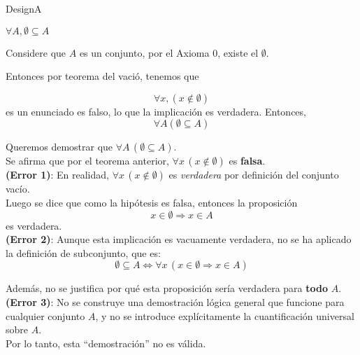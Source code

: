 \begin{assignment}{DesignA}

\useDesignAactivate

\subtitle{Relaciones y Órdenes}

\begin{problema}
$\forall A, \emptyset \subseteq A$
\end{problema}
\begin{demostracion}
Considere que $A$ es un conjunto, por el Axioma 0, existe el $\emptyset$.

Entonces por teorema del vació, tenemos que 

$$
\forall x , (x \notin \emptyset)
$$
es un enunciado es falso, lo que la implicación es verdadera. Entonces,
$$
\forall A (\emptyset \subseteq A)
$$
\end{demostracion}



\begin{demostracion}
Queremos demostrar que \( \forall A\,(\emptyset \subseteq A) \). \\

Se afirma que por el teorema anterior, \( \forall x\, (x \notin \emptyset) \) es \textbf{falsa}.\\

\textbf{(Error 1)}: En realidad, \( \forall x\, (x \notin \emptyset) \) es \emph{verdadera} por definición del conjunto vacío. \\

Luego se dice que como la hipótesis es falsa, entonces la proposición 
\[
x \in \emptyset \Rightarrow x \in A
\]
es verdadera. \\

\textbf{(Error 2)}: Aunque esta implicación es vacuamente verdadera, no se ha aplicado la definición de subconjunto, que es:
\[
\emptyset \subseteq A \iff \forall x\,(x \in \emptyset \Rightarrow x \in A)
\]

Además, no se justifica por qué esta proposición sería verdadera para \textbf{todo} \( A \).\\

\textbf{(Error 3)}: No se construye una demostración lógica general que funcione para cualquier conjunto \( A \), y no se introduce explícitamente la cuantificación universal sobre \( A \).\\

Por lo tanto, esta ``demostración'' no es válida. 
\end{demostracion}


\end{assignment}